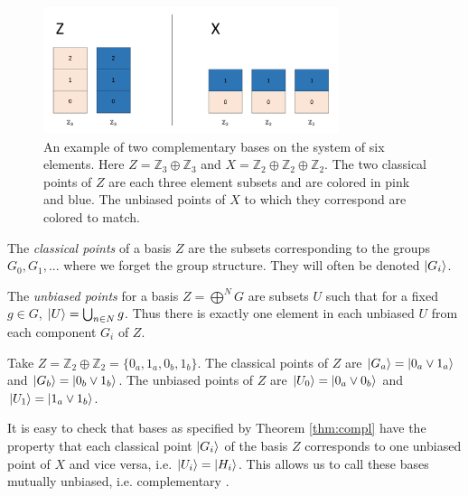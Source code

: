 \begin{figure}[tb]
\begin{center}
\includegraphics[height=10em,natwidth=1091,natheight=468,scale=1]{images/complexample.png}
\end{center}
\vspace{-14pt}
\caption{An example of two complementary bases on the system of six elements. Here $Z=\mathbb{Z}_3\oplus\mathbb{Z}_3$ and $X = \mathbb{Z}_2\oplus\mathbb{Z}_2\oplus \mathbb{Z}_2$.  The two classical points of $Z$ are each three element subsets and are colored in pink and blue. The unbiased points of $X$ to which they correspond are colored to match.
}
\label{complEx}
\end{figure}

\begin{corollary}
The \emph{classical points} of a basis $Z$ are the subsets corresponding to the groups $G_0, G_1,...$ where we forget the group structure. They will often be denoted $| G_i \rangle$.
\end{corollary}

\begin{corollary}
The \emph{unbiased points} for a basis $Z = \bigoplus^{N}G$ are subsets $U$ such that for a fixed $g\in G$, $| U \rangle = \bigcup_{n\in N}g$.
Thus there is exactly one element in each unbiased $U$ from each component $G_i$ of $Z$.
\end{corollary}

\begin{example}
Take $Z = \mathbb{Z}_2\oplus\mathbb{Z}_2=\{0_a,1_a,0_b,1_b\}$. The classical points of $Z$ are $| G_a \rangle=| 0_a\vee1_a \rangle$ and $| G_b \rangle=| 0_b\vee1_b \rangle$.  The unbiased points of $Z$ are $| U_0 \rangle=| 0_a\vee0_b \rangle$ and $| U_1 \rangle=| 1_a\vee1_b \rangle$.
\end{example}

It is easy to check that bases as specified by Theorem \ref{thm:compl} have the property that each classical point $| G_i \rangle$ of the basis $Z$ corresponds to one unbiased point of $X$ and vice versa, i.e. $| U_i \rangle=| H_i \rangle$.
This allows us to call these bases mutually unbiased, i.e. complementary \cite{evans2009classifying}.
